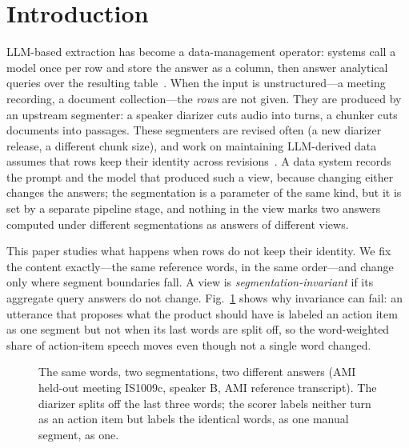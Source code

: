 \documentclass[conference]{IEEEtran}
\begin{document}
\section{Introduction}
LLM-based extraction has become a data-management operator: systems call a model once per row and store the answer
as a column, then answer analytical queries over the resulting table~\cite{evaporate,lotus,palimpzest}. When the input is
unstructured---a meeting recording, a document collection---the \emph{rows} are not given. They are produced by an
upstream segmenter: a speaker diarizer cuts audio into turns, a chunker cuts documents into passages. These segmenters
are revised often (a new diarizer release, a different chunk size), and work on maintaining LLM-derived data assumes
that rows keep their identity across revisions~\cite{semreuse,sivm}. A data system records the prompt and the model
that produced such a view, because changing either changes the answers; the segmentation is a parameter of the same
kind, but it is set by a separate pipeline stage, and nothing in the view marks two answers computed under different
segmentations as answers of different views.

This paper studies what happens when rows do not keep their identity. We fix the content exactly---the same reference words, in the same
order---and change only where segment boundaries fall. A view is \emph{segmentation-invariant} if its aggregate
query answers do not change. Fig.~\ref{fig:example} shows why invariance can fail: an utterance that proposes what the
product should have is labeled an action item as one segment but not when its last words are split off, so the
word-weighted share of action-item speech moves even though not a single word changed.

\begin{figure}[t]
\centering
\footnotesize

\caption{The same words, two segmentations, two different answers (AMI held-out meeting IS1009c, speaker B, AMI
reference transcript). The diarizer splits off the last three words; the scorer labels neither turn as an action
item but labels the identical words, as one manual segment, as one.}
\label{fig:example}
\end{figure}
\end{document}
